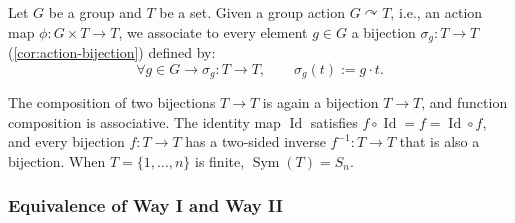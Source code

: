 \begin{content}
Let $G$ be a group and $T$ be a set. Given a group action $G \curvearrowright T$, i.e., an action map $\phi \colon G \times T \to T$, we associate to every element $g \in G$ a bijection $\sigma_g \colon T \to T$ (\cref{cor:action-bijection}) defined by:
\[
\forall g \in G \longrightarrow \sigma_g \colon T \to T, \qquad \sigma_g(t) := g \cdot t.
\]


\begin{steps}
The composition of two bijections $T \to T$ is again a bijection $T \to T$, and function composition is associative. The identity map $\operatorname{Id}$ satisfies $f \circ \operatorname{Id} = f = \operatorname{Id} \circ f$, and every bijection $f \colon T \to T$ has a two-sided inverse $f^{-1} \colon T \to T$ that is also a bijection. When $T = \{1, \dots, n\}$ is finite, $\operatorname{Sym}(T) = S_n$.
\end{steps}
\end{content}

\begin{hidden}
\end{hidden}

\subsubsection{Equivalence of Way I and Way II}

